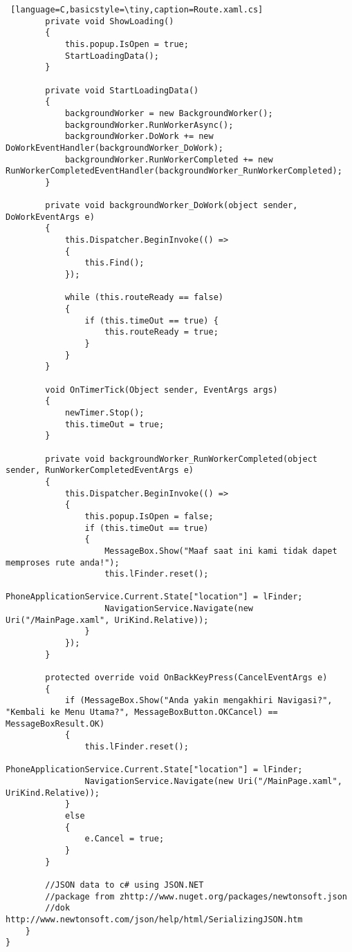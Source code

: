\begin{lstlisting} [language=C,basicstyle=\tiny,caption=Route.xaml.cs]
        private void ShowLoading()
        {
            this.popup.IsOpen = true;
            StartLoadingData();
        }

        private void StartLoadingData()
        {
            backgroundWorker = new BackgroundWorker();
            backgroundWorker.RunWorkerAsync();
            backgroundWorker.DoWork += new DoWorkEventHandler(backgroundWorker_DoWork);
            backgroundWorker.RunWorkerCompleted += new RunWorkerCompletedEventHandler(backgroundWorker_RunWorkerCompleted);
        }

        private void backgroundWorker_DoWork(object sender, DoWorkEventArgs e)
        {
            this.Dispatcher.BeginInvoke(() =>
            {
                this.Find();
            });
            
            while (this.routeReady == false)
            {
                if (this.timeOut == true) {
                    this.routeReady = true;
                }
            }
        }

        void OnTimerTick(Object sender, EventArgs args)
        {
            newTimer.Stop();
            this.timeOut = true;
        }

        private void backgroundWorker_RunWorkerCompleted(object sender, RunWorkerCompletedEventArgs e)
        {
            this.Dispatcher.BeginInvoke(() =>
            {
                this.popup.IsOpen = false;
                if (this.timeOut == true)
                {
                    MessageBox.Show("Maaf saat ini kami tidak dapet memproses rute anda!");
                    this.lFinder.reset();
										PhoneApplicationService.Current.State["location"] = lFinder;
                    NavigationService.Navigate(new Uri("/MainPage.xaml", UriKind.Relative));
                }
            });
        }

        protected override void OnBackKeyPress(CancelEventArgs e)
        {
            if (MessageBox.Show("Anda yakin mengakhiri Navigasi?", "Kembali ke Menu Utama?", MessageBoxButton.OKCancel) == MessageBoxResult.OK)
            {
                this.lFinder.reset();
								PhoneApplicationService.Current.State["location"] = lFinder;
                NavigationService.Navigate(new Uri("/MainPage.xaml", UriKind.Relative));
            }
            else
            {
                e.Cancel = true;
            }
        }

        //JSON data to c# using JSON.NET
        //package from zhttp://www.nuget.org/packages/newtonsoft.json
        //dok http://www.newtonsoft.com/json/help/html/SerializingJSON.htm
    }
}
\end{lstlisting}

